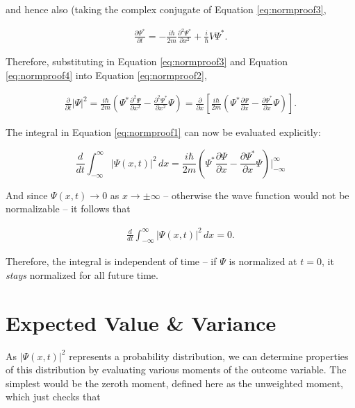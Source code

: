 and hence also (taking the complex conjugate of Equation \ref{eq:normproof3}, 

\begin{align} \label{eq:normproof4}
  \frac{\partial \Psi^*}{\partial t} = -\frac{i\hbar}{2m} \frac{\partial^2
  \Psi^*}{\partial x^2} + \frac{i}{\hbar} V\Psi^*.
\end{align}\vspace{3px}

Therefore, substituting in Equation \ref{eq:normproof3} and Equation
\ref{eq:normproof4} into Equation \ref{eq:normproof2}, 

\begin{align} \label{eq:normproof5}
  \frac{\partial }{\partial t} |\Psi|^2 = \frac{i\hbar}{2m}\left( \Psi^*
  \frac{\partial^2 \Psi}{\partial x^2} - \frac{\partial^2 \Psi^*}{\partial x^2}
\Psi\right) = \frac{\partial }{\partial x} \left[ \frac{i\hbar}{2m} \left(
  \Psi^* \frac{\partial \Psi}{\partial x} - \frac{\partial \Psi^*}{\partial x}
\Psi\right) \right].  
\end{align}\vspace{3px}


The integral in Equation \ref{eq:normproof1} can now be evaluated explicitly: 

\[
\frac{d }{d t} \int_{-\infty}^{\infty} |\Psi(x, t)|^2 \, dx
= \frac{i\hbar}{2m}\left( \Psi^* \frac{\partial \Psi}{\partial x}
- \frac{\partial \Psi^*}{\partial x} \Psi \right) \Bigg|_{-\infty}^\infty 
\] \vspace{3px}

And since $\Psi(x,t) \rightarrow 0$ as $x \rightarrow \pm \infty$ -- otherwise
the wave function would not be normalizable -- it follows that 

\begin{align} \label{eq:normproof6}
  \frac{d }{d t} \int_{-\infty}^{\infty} |\Psi(x, t)|^2 \, dx = 0.
\end{align}\vspace{3px}

Therefore, the integral is independent of time -- if $\Psi$ is normalized at
$t = 0$, it  \textit{stays} normalized for all future time. 

\section{Expected Value \& Variance}

As $|\Psi(x, t)|^2$ represents a probability distribution, we can determine
properties of this distribution by evaluating various moments of the outcome
variable. The simplest would be the zeroth moment, defined here as the
unweighted moment, which just checks that 


